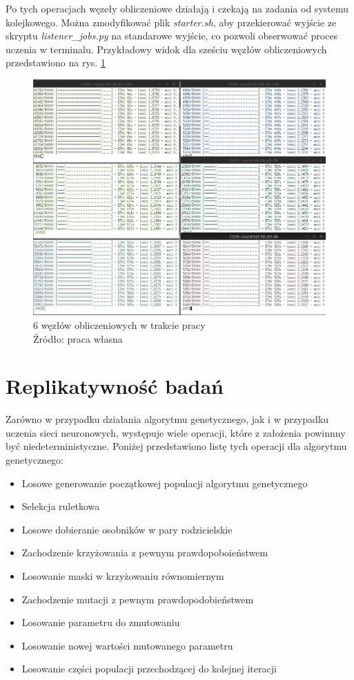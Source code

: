 Po tych operacjach węzeły obliczeniowe działają i czekają na zadania od systemu kolejkowego.
Można zmodyfikować plik \textit{starter.sh}, aby przekierować wyjście ze skryptu \textit{listener\_jobs.py} na standarowe wyjście, co pozwoli obserwować proces uczenia w terminalu.
Przykładowy widok dla sześciu węzłów obliczeniowych przedstawiono na rys. \ref{fig:wip}

\begin{figure}[h!tb]
	 \centering
	 \includegraphics[width = 1.0\linewidth]{img/wip}
	 \caption{6 węzłów obliczeniowych w trakcie pracy \\
              Źródło: praca własna}
	 \label{fig:wip}
\end{figure}

\section{Replikatywność badań}\label{sec:replicativity}
Zarówno w przypadku działania algorytmu genetycznego, jak i w przypadku uczenia sieci neuronowych, występuje wiele operacji, które z założenia powinnny być niedeterministyczne.
Poniżej przedstawiono listę tych operacji dla algorytmu genetycznego:
\begin{itemize}
  \item Losowe generowanie początkowej populacji algorytmu genetycznego
  \item Selekcja ruletkowa
  \item Losowe dobieranie osobników w pary rodzicielskie
  \item Zachodzenie krzyżowania z pewnym prawdopoboieństwem
  \item Losowanie maski w krzyżowaniu równomiernym
  \item Zachodzenie mutacji z pewnym prawdopodobieństwem
  \item Losowanie parametru do zmutowaniu
  \item Losowanie nowej wartości mutowanego parametru
  \item Losowanie części populacji przechodzącej do kolejnej iteracji
\end{itemize}

